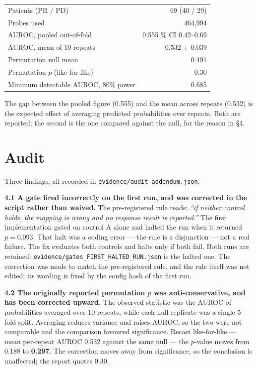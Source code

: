 \documentclass[11pt,a4paper]{article}
\begin{document}
\begin{center}
\begin{tabular}{@{}lr@{}}
\toprule
Patients (PR / PD) & 69 (40 / 29) \\
Probes used & 464{,}994 \\
AUROC, pooled out-of-fold & 0.555 \quad 95\% CI 0.42--0.69 \\
AUROC, mean of 10 repeats & 0.532 $\pm$ 0.039 \\
Permutation null mean & 0.491 \\
Permutation $p$ (like-for-like) & 0.30 \\
Minimum detectable AUROC, 80\% power & 0.685 \\
\bottomrule
\end{tabular}
\end{center}

The gap between the pooled figure (0.555) and the mean across repeats
(0.532) is the expected effect of averaging predicted probabilities over repeats. Both are
reported; the second is the one compared against the null, for the reason in \S4.

\section{Audit}

Three findings, all recorded in \texttt{evidence/audit\_addendum.json}.

\textbf{4.1 A gate fired incorrectly on the first run, and was corrected in the script rather
than waived.} The pre-registered rule reads: \emph{``if neither control holds, the mapping is
wrong and no response result is reported.''} The first implementation gated on control A alone
and halted the run when it returned $p=0.093$. That halt was a coding error --- the rule is a
disjunction --- not a real failure. The fix evaluates both controls and halts only if both
fail. Both runs are retained: \texttt{evidence/gates\_FIRST\_HALTED\_RUN.json} is the halted
one. The correction was made to match the pre-registered rule, and the rule itself was not
edited; its wording is fixed by the config hash of the first run.

\textbf{4.2 The originally reported permutation $p$ was anti-conservative, and has been
corrected upward.} The observed statistic was the AUROC of probabilities averaged over 10
repeats, while each null replicate was a single 5-fold split. Averaging reduces variance and
raises AUROC, so the two were not comparable and the comparison favoured significance. Recast
like-for-like --- mean per-repeat AUROC 0.532 against the same null --- the $p$-value moves from
0.188 to \textbf{0.297}. The correction moves away from significance, so the conclusion is
unaffected; the report quotes 0.30.
\end{document}
